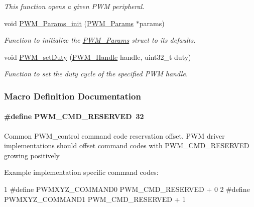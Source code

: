 \begin{DoxyCompactItemize}
\begin{DoxyCompactList}\small\item\em This function opens a given P\+W\+M peripheral. \end{DoxyCompactList}\item 
void \hyperlink{_p_w_m_8h_acbdd3192f9f06bf689e4a3855926dcac}{P\+W\+M\+\_\+\+Params\+\_\+init} (\hyperlink{struct_p_w_m___params}{P\+W\+M\+\_\+\+Params} $\ast$params)
\begin{DoxyCompactList}\small\item\em Function to initialize the \hyperlink{struct_p_w_m___params}{P\+W\+M\+\_\+\+Params} struct to its defaults. \end{DoxyCompactList}\item 
void \hyperlink{_p_w_m_8h_a9b4c4b744af933d4f2678dc18b49bfb4}{P\+W\+M\+\_\+set\+Duty} (\hyperlink{_p_w_m_8h_afdefc765f42bbad4dca246fda6e1354b}{P\+W\+M\+\_\+\+Handle} handle, uint32\+\_\+t duty)
\begin{DoxyCompactList}\small\item\em Function to set the duty cycle of the specified P\+W\+M handle. \end{DoxyCompactList}\end{DoxyCompactItemize}


\subsubsection{Macro Definition Documentation}
\paragraph[{P\+W\+M\+\_\+\+C\+M\+D\+\_\+\+R\+E\+S\+E\+R\+V\+E\+D}]{\setlength{\rightskip}{0pt plus 5cm}\#define P\+W\+M\+\_\+\+C\+M\+D\+\_\+\+R\+E\+S\+E\+R\+V\+E\+D~32}\label{_p_w_m_8h_ad731f4db58c72d280900da4be6e3434c}
Common P\+W\+M\+\_\+control command code reservation offset. P\+W\+M driver implementations should offset command codes with P\+W\+M\+\_\+\+C\+M\+D\+\_\+\+R\+E\+S\+E\+R\+V\+E\+D growing positively

Example implementation specific command codes\+: 
\begin{DoxyCode}
1 #define PWMXYZ\_COMMAND0         PWM\_CMD\_RESERVED + 0
2 #define PWMXYZ\_COMMAND1         PWM\_CMD\_RESERVED + 1
\end{DoxyCode}
